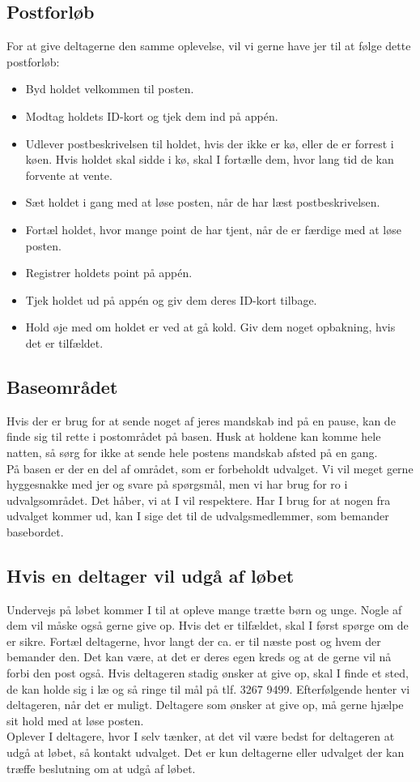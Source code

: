 \subsection{Postforløb}
For at give deltagerne den samme oplevelse, vil vi gerne have jer til at følge dette postforløb:
\begin{itemize}
  \item Byd holdet velkommen til posten.
  \item Modtag holdets ID-kort og tjek dem ind på app\'en.
  \item Udlever postbeskrivelsen til holdet, hvis der ikke er kø, eller de er forrest i køen. Hvis holdet skal sidde i kø, skal I fortælle dem, hvor lang tid de kan forvente at vente.
  \item Sæt holdet i gang med at løse posten, når de har læst postbeskrivelsen.
  \item Fortæl holdet, hvor mange point de har tjent, når de er færdige med at løse posten.
  \item Registrer holdets point på app\'en.
  \item Tjek holdet ud på app\'en og giv dem deres ID-kort tilbage.
  \item Hold øje med om holdet er ved at gå kold. Giv dem noget opbakning, hvis det er tilfældet.
\end{itemize}
\newpage
\vspace*{.4cm}
\subsection{Baseområdet}
Hvis der er brug for at sende noget af jeres mandskab ind på en pause, kan de finde sig til rette i postområdet på basen. Husk at holdene kan komme hele natten, så sørg for ikke at sende hele postens mandskab afsted på en gang.\\
På basen er der en del af området, som er forbeholdt udvalget. Vi vil meget gerne hyggesnakke med jer og svare på spørgsmål, men vi har brug for ro i udvalgsområdet. Det håber, vi at I vil respektere. Har I brug for at nogen fra udvalget kommer ud, kan I sige det til de udvalgsmedlemmer, som bemander basebordet.
\subsection{Hvis en deltager vil udgå af løbet}
Undervejs på løbet kommer I til at opleve mange trætte børn og unge. Nogle af dem vil måske også gerne give op. Hvis det er tilfældet, skal I først spørge om de er sikre. Fortæl deltagerne, hvor langt der ca. er til næste post og hvem der bemander den. Det kan være, at det er deres egen kreds og at de gerne vil nå forbi den post også. Hvis deltageren stadig ønsker at give op, skal I finde et sted, de kan holde sig i læ og så ringe til mål på tlf. 3267 9499. Efterfølgende henter vi deltageren, når det er muligt. Deltagere som ønsker at give op, må gerne hjælpe sit hold med at løse posten.\\
\newline
Oplever I deltagere, hvor I selv tænker, at det vil være bedst for deltageren at udgå at løbet, så kontakt udvalget. Det er kun deltagerne eller udvalget der kan træffe beslutning om at udgå af løbet.
